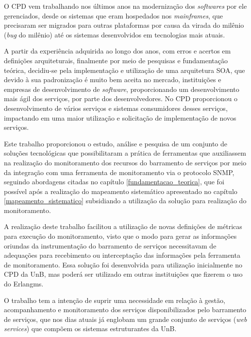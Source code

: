 \label{conclusao}

O \acrshort{CPD} vem trabalhando nos últimos anos na modernização dos \textit{softwares} por ele gerenciados, desde os sistemas que eram hospedados nos \textit{mainframes}, que precisaram ser migrados para outras plataformas por causa da virada do milênio (\textit{bug} do milênio) até os sistemas desenvolvidos em tecnologias mais atuais. 

A partir da experiência adquirida ao longo dos anos, com erros e acertos em definições arquiteturais, finalmente por meio de pesquisas e fundamentação teórica, decidiu-se pela implementação e utilização de uma arquitetura \acrshort{SOA}, que devido à sua padronização é muito bem aceita no mercado, instituições e empresas de desenvolvimento de \textit{software}, proporcionando um desenvolvimento mais ágil dos serviços, por parte dos desenvolvedores. No \acrshort{CPD} proporcionou o desenvolvimento de vários serviços e sistemas consumidores desses serviços, impactando em uma maior utilização e solicitação de implementação de novos serviços.      

Este trabalho proporcionou o estudo, análise e pesquisa de um conjunto de soluções tecnológicas que possibilitaram a prática de ferramentas que auxiliassem na realização do monitoramento dos recursos do barramento de serviços por meio da integração com uma ferramenta de monitoramento via o protocolo \acrshort{SNMP}, seguindo  abordagens citadas no capítulo \ref{fundamentacao_teorica}, que foi possível após a realização do mapeamento sistemático apresentado no capítulo \ref{mapeamento_sistematico} subsidiando a utilização da solução para realização do monitoramento.  

A realização deste trabalho facilitou a utilização de novas definições de métricas para execução do monitoramento, visto que o modo para gerar as informações oriundas da instrumentação do barramento de serviços necessitavam de adequações para recebimento ou interceptação das informações pela ferramenta de monitoramento. Essa solução foi desenvolvida para utilização inicialmente no \acrshort{CPD} da \acrshort{UnB}, mas poderá ser utilizado em outras instituições que fizerem o uso do Erlangms. 

O trabalho tem a intenção de suprir uma necessidade em relação à gestão, acompanhamento e monitoramento dos serviços disponibilizados pelo barramento de serviços, que nos dias atuais já englobam um grande conjunto de serviços (\textit{web services}) que compõem os sistemas estruturantes da \acrshort{UnB}.


